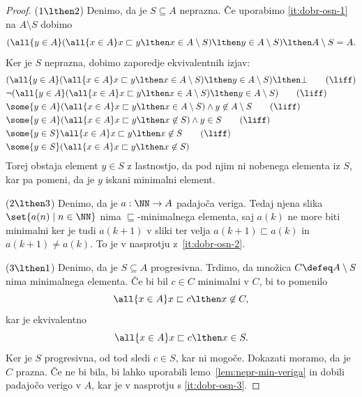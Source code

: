 \begin{proof}
  ($1 \lthen 2$)
  Denimo, da je $S \subseteq A$ neprazna. Če uporabimo \eqref{it:dobr-osn-1} na $A \setminus S$ dobimo
  \begin{equation*}
    (\all{y \in A} (\all{x \in A} x \sqsubset y \lthen x \in A \setminus S) \lthen y \in A \setminus S) \lthen A \setminus S = A.
  \end{equation*}
  Ker je $S$ neprazna, dobimo zaporedje ekvivalentnih izjav:
  \begin{align*}
    &(\all{y \in A} (\all{x \in A} x \sqsubset y \lthen x \in A \setminus S) \lthen y \in A \setminus S) \lthen \bot
    \tag{$\liff$} \\
    &\lnot (\all{y \in A} (\all{x \in A} x \sqsubset y \lthen x \in A \setminus S) \lthen y \in A \setminus S)
    \tag{$\liff$} \\
    &\some{y \in A} (\all{x \in A} x \sqsubset y \lthen x \in A \setminus S) \land y \not\in A \setminus S
    \tag{$\liff$} \\
    &\some{y \in A} (\all{x \in A} x \sqsubset y \lthen x \not\in S) \land y \in S
    \tag{$\liff$} \\
    &\some{y \in S} \all{x \in A} x \sqsubset y \lthen x \not\in S
    \tag{$\liff$} \\
    &\some{y \in S} (\all{x \in A} x \sqsubset y \lthen x \not\in S) \notag
  \end{align*}
  Torej obstaja element $y \in S$ z lastnostjo, da pod njim ni nobenega elementa iz
  $S$, kar pa pomeni, da je $y$ iskani minimalni element.

  ($2 \lthen 3$) Denimo, da je $a : \NN \to A$ padajoča veriga. Tedaj njena slika $\set{ a(n) \mid n \in \NN }$ nima $\sqsubseteq$-minimalnega elementa, saj $a(k)$ ne more biti minimalni ker je tudi $a(k+1)$ v sliki ter velja $a(k+1) \sqsubset a(k)$ in $a(k+1) \neq a(k)$. To je v nasprotju z~\eqref{it:dobr-osn-2}.

  ($3 \lthen 1$) Denimo, da je $S \subseteq A$ progresivna. Trdimo, da množica $C \defeq A \setminus S$ nima
  minimalnega elementa. Če bi bil $c \in C$ minimalni v $C$, bi to pomenilo
  \begin{equation*}
    \all{x \in A} x \sqsubset c \lthen x \not\in C,
  \end{equation*}
  kar je ekvivalentno
  \begin{equation*}
    \all{x \in A} x \sqsubset c \lthen x \in S.
  \end{equation*}
  Ker je $S$ progresivna, od tod sledi $c \in S$, kar ni mogoče.
  Dokazati moramo, da je $C$ prazna. Če ne bi bila, bi lahko uporabili lemo~\ref{lem:nepr-min-veriga} in dobili padajočo verigo v $A$, kar je v nasprotju s \eqref{it:dobr-osn-3}.
\end{proof}

